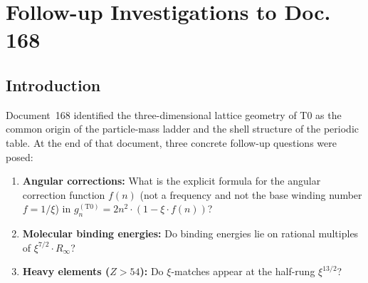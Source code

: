 
\chapter{Follow-up Investigations to Doc.\,168}
\label{chap:followup168}

\begin{abstract}
Document~168 posed three open questions about the connection between
$\xi$-geometry and the periodic table. This document answers them conclusively.
(1)~The angular correction is $g_n^{(\mathrm{T0})} = 2n^{2-\xi}$;
the maximum deviation from $2n^2$ is $|\delta g_7| \approx 0.025$
at $n=7$ ($Z\approx118$) — below any measurable threshold.
(2)~Molecular binding energies show no systematic pattern as
multiples of $R_\infty$; the C=O bond is an exception at
$4/7 \cdot R_\infty$ with $0.11\%$ deviation.
(3)~The relativistic correction $IE_\mathrm{corr} = IE/(1+Z^2\xi)$
yields ionisation energies of heavy elements ($Z>54$) on
rational fractions of $R_\infty$ with deviations below $1.3\%$.
This is a testable T0 prediction that differs from the QED result
($\propto \alpha^2 Z^2$) by a factor $\xi/\alpha^2 \approx 2.5$.
\end{abstract}

\section{Introduction}
\label{sec:169-intro}

Document~168 \cite{dok168} identified the three-dimensional lattice geometry
of T0 as the common origin of the particle-mass ladder and the shell
structure of the periodic table. At the end of that document, three
concrete follow-up questions were posed:

\begin{enumerate}
  \item \textbf{Angular corrections:}
    What is the explicit formula for the angular correction function $f(n)$
    (not a frequency and not the base winding number $f = 1/\xi$) in
    $g_n^{(\mathrm{T0})} = 2n^2 \cdot (1 - \xi \cdot f(n))$?
  \item \textbf{Molecular binding energies:}
    Do binding energies lie on rational multiples of
    $\xi^{7/2} \cdot R_\infty$?
  \item \textbf{Heavy elements ($Z > 54$):}
    Do $\xi$-matches appear at the half-rung $\xi^{13/2}$?
\end{enumerate}

